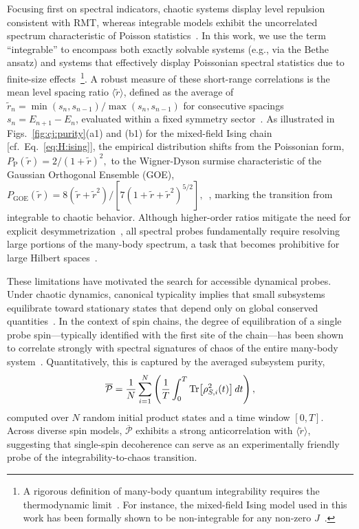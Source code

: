 \documentclass[pra,twocolumn,aps,showpacs,superscriptaddress,longbibliography]{revtex4-2}%
\begin{document}
Focusing first on spectral indicators, chaotic systems display level repulsion consistent with RMT, whereas integrable models exhibit the uncorrelated spectrum characteristic of Poisson statistics~\cite{berry_1977_level}. In this work, we use the term ``integrable'' to encompass both exactly solvable systems (e.g., via the Bethe ansatz) and systems that effectively display Poissonian spectral statistics due to finite-size effects~\protect\footnote{A rigorous definition of many-body quantum integrability requires the thermodynamic limit~\cite{caux_2011_remarks}. For instance, the mixed-field Ising model used in this work has been formally shown to be non-integrable for any non-zero $J$~\cite{chiba_2024_proof}.}. A robust measure of these short-range correlations is the mean level spacing ratio $\langle \tilde{r} \rangle$, defined as the average of $\tilde{r}_n = \min(s_n, s_{n-1})/\max(s_n, s_{n-1})$ for consecutive spacings $s_n = E_{n+1} - E_n$, evaluated within a fixed symmetry sector~\cite{oganesyan_2007_localization}. As illustrated in Figs.~\ref{fig:cj:purity}(a1) and (b1) for the mixed-field Ising chain [cf.~Eq.~\eqref{eq:H:ising}], the empirical distribution shifts from the Poissonian form,
\(
P_{\text{P}}(\tilde{r}) = 2/(1+\tilde{r})^2,
\)
to the Wigner-Dyson surmise characteristic of the Gaussian Orthogonal Ensemble (GOE),
\(
P_{\text{GOE}}(\tilde{r}) = 8(\tilde{r} + \tilde{r}^2) / [7(1+\tilde{r}+\tilde{r}^2)^{5/2}],
\)~\cite{atas_2013_distribution}, marking the transition from integrable to chaotic behavior. Although higher-order ratios mitigate the need for explicit desymmetrization~\cite{tekur_2020_symmetry}, all spectral probes fundamentally require resolving large portions of the many-body spectrum, a task that becomes prohibitive for large Hilbert spaces~\cite{scialchi_2024_integrabilitytochaos, bernien2017probing, huang_2020_predicting, brydges2019probing}.

These limitations have motivated the search for accessible dynamical probes. Under chaotic dynamics, canonical typicality implies that small subsystems equilibrate toward stationary states that depend only on global conserved quantities~\cite{goldstein_2006_canonical, rigol_2008_thermalization}. In the context of spin chains, the degree of equilibration of a single probe spin---typically identified with the first site of the chain---has been shown to correlate strongly with spectral signatures of chaos of the entire many-body system~\cite{mirkin_2021_quantum}. Quantitatively, this is captured by the averaged subsystem purity,
\begin{equation}\label{eq:avg:P}
\overline{\mathcal{P}}=\frac{1}{N}\sum_{i=1}^N
\left(\frac{1}{T}\int_0^T \Tr[\rho_{S,i}^2(t)]\,dt\right),
\end{equation}
computed over $N$ random initial product states and a time window $[0,T]$. Across diverse spin models, $\overline{\mathcal{P}}$ exhibits a strong anticorrelation with $\langle \tilde{r} \rangle$, suggesting that single-spin decoherence can serve as an experimentally friendly probe of the integrability-to-chaos transition.
\end{document}
